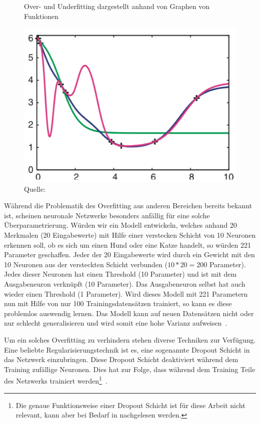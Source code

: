 \begin{figure}[h!]
    \captionsetup{width=.9\linewidth}
    \caption{Over- und Underfitting dargestellt anhand von Graphen von Funktionen}
    \label{krogh:d}
    \centering
    \includegraphics[width=0.6\linewidth]{graphics/krogh/krogh_overfitting.png}
    \caption*{Quelle: \textcite{Krogh2008}}
\end{figure}

Während die Problematik des Overfitting aus anderen Bereichen bereits bekannt ist, scheinen neuronale Netzwerke besonders anfällig für eine solche Überparametrierung. Würden wir ein Modell entwickeln, welches anhand 20 Merkmalen (20 Eingabewerte) mit Hilfe einer verstecken Schicht von 10 Neuronen erkennen soll, ob es sich um einen Hund oder eine Katze handelt, so würden 221 Parameter geschaffen. Jeder der 20 Eingabewerte wird durch ein Gewicht mit den 10 Neuronen aus der versteckten Schicht verbunden ($10 * 20 = 200$ Parameter). Jedes dieser Neuronen hat einen Threshold (10 Parameter) und ist mit dem Ausgabeneuron verknüpft (10 Parameter). Das Ausgabeneuron selbst hat auch wieder einen Threshold (1 Parameter). Wird dieses Modell mit 221 Parametern nun mit Hilfe von nur 100 Trainingsdatensätzen trainiert, so kann es diese problemlos auswendig lernen. Das Modell kann auf neuen Datensätzen nicht oder nur schlecht generalisieren und wird somit eine hohe Varianz aufweisen~\autocite{Krogh2008}.

Um ein solches Overfitting zu verhindern stehen diverse Techniken zur Verfügung. Eine beliebte Regularisierungstechnik ist es, eine sogenannte Dropout Schicht in das Netzwerk einzubringen. Diese Dropout Schicht deaktiviert während dem Training zufällige Neuronen. Dies hat zur Folge, dass während dem Training Teile des Netzwerks trainiert werden\footnote{Die genaue Funktionsweise einer Dropout Schicht ist für diese Arbeit nicht relevant, kann aber bei Bedarf in \textcite{Goodfellow2016} nachgelesen werden.}~\autocite{Goodfellow2016}.


